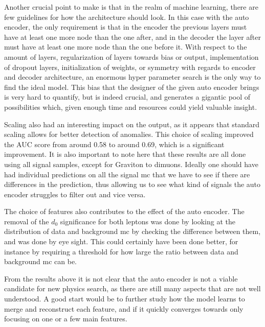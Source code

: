 \documentclass[ reprint, amsmath,amssymb, aps, nofootinbib]{revtex4-2}
\begin{document}
Another crucial point to make is that in the realm of machine learning, there are few guidelines for how the architecture should look. In this case with the auto encoder, the only requirement is that in the encoder the previous layers must have at least one more node than the one after, and in the decoder the layer after must have at least one more node than the one before it. With respect to the amount of layers, regularization of layers towards bias or output, implementation of dropout layers, initialization of weights, or symmetry with regards to encoder and decoder architecture, an enormous hyper parameter search is the only way to find the ideal model. This bias that the designer of the given auto encoder brings is very hard to quantify, but is indeed crucial, and generates a gigantic pool of possibilities which, given enough time and resources could yield valuable insight. \par \par

Scaling also had an interesting impact on the output, as it appears that standard scaling allows for better detection of anomalies. This choice of scaling improved the AUC score from around 0.58 to around 0.69, which is a significant improvement.
It is also important to note here that these results are all done using all signal samples, except for Graviton to dimuons. Ideally one should have had individual predictions on all the signal mc that we have to see if there are differences in the prediction, thus allowing us to see what kind of signals the auto encoder struggles to filter out and vice versa. \par \par

The choice of features also contributes to the effect of the auto encoder. The removal of the $d_0$ significance for both leptons was done by looking at the distribution of data and background mc by checking the difference between them, and was done by eye sight. This could certainly have been done better, for instance by requiring a threshold for how large the ratio between data and background mc can be. \par \par

From the results above it is not clear that the auto encoder is not a viable candidate for new physics search, as there are still many aspects that are not well understood. A good start would be to further study how the model learns to merge and reconstruct each feature, and if it quickly converges towards only focusing on one or a few main features. 
\end{document}
